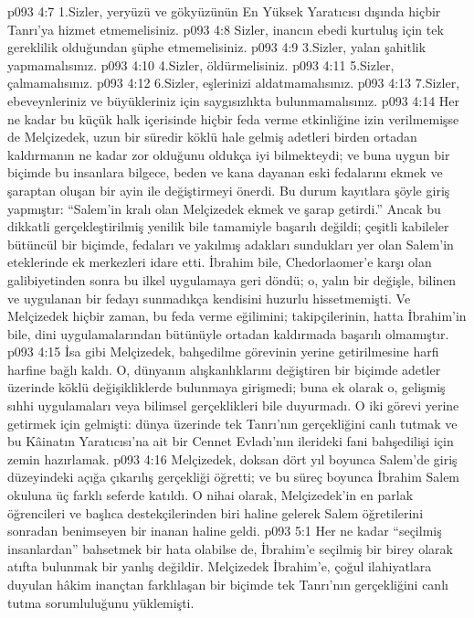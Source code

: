 \vs p093 4:7 1.\bibnobreakspace Sizler, yeryüzü ve gökyüzünün En Yüksek Yaratıcısı dışında hiçbir Tanrı’ya hizmet etmemelisiniz.
\vs p093 4:8 Sizler, inancın ebedi kurtuluş için tek gereklilik olduğundan şüphe etmemelisiniz.
\vs p093 4:9 3.\bibnobreakspace Sizler, yalan şahitlik yapmamalısınız.
\vs p093 4:10 4.\bibnobreakspace Sizler, öldürmelisiniz.
\vs p093 4:11 5.\bibnobreakspace Sizler, çalmamalısınız.
\vs p093 4:12 6.\bibnobreakspace Sizler, eşlerinizi aldatmamalısınız.
\vs p093 4:13 7.\bibnobreakspace Sizler, ebeveynleriniz ve büyükleriniz için saygısızlıkta bulunmamalısınız.
\vs p093 4:14 Her ne kadar bu küçük halk içerisinde hiçbir feda verme etkinliğine izin verilmemişse de Melçizedek, uzun bir süredir köklü hale gelmiş adetleri birden ortadan kaldırmanın ne kadar zor olduğunu oldukça iyi bilmekteydi; ve buna uygun bir biçimde bu insanlara bilgece, beden ve kana dayanan eski fedalarını ekmek ve şaraptan oluşan bir ayin ile değiştirmeyi önerdi. Bu durum kayıtlara şöyle giriş yapmıştır: “Salem’in kralı olan Melçizedek ekmek ve şarap getirdi.” Ancak bu dikkatli gerçekleştirilmiş yenilik bile tamamiyle başarılı değildi; çeşitli kabileler bütüncül bir biçimde, fedaları ve yakılmış adakları sundukları yer olan Salem’in eteklerinde ek merkezleri idare etti. İbrahim bile, Chedorlaomer’e karşı olan galibiyetinden sonra bu ilkel uygulamaya geri döndü; o, yalın bir değişle, bilinen ve uygulanan bir fedayı sunmadıkça kendisini huzurlu hissetmemişti. Ve Melçizedek hiçbir zaman, bu feda verme eğilimini; takipçilerinin, hatta İbrahim’in bile, dini uygulamalarından bütünüyle ortadan kaldırmada başarılı olmamıştır.
\vs p093 4:15 İsa gibi Melçizedek, bahşedilme görevinin yerine getirilmesine harfi harfine bağlı kaldı. O, dünyanın alışkanlıklarını değiştiren bir biçimde adetler üzerinde köklü değişikliklerde bulunmaya girişmedi; buna ek olarak o, gelişmiş sıhhi uygulamaları veya bilimsel gerçeklikleri bile duyurmadı. O iki görevi yerine getirmek için gelmişti: dünya üzerinde tek Tanrı’nın gerçekliğini canlı tutmak ve bu Kâinatın Yaratıcısı’na ait bir Cennet Evladı’nın ilerideki fani bahşedilişi için zemin hazırlamak.
\vs p093 4:16 Melçizedek, doksan dört yıl boyunca Salem’de giriş düzeyindeki açığa çıkarılış gerçekliği öğretti; ve bu süreç boyunca İbrahim Salem okuluna üç farklı seferde katıldı. O nihai olarak, Melçizedek’in en parlak öğrencileri ve başlıca destekçilerinden biri haline gelerek Salem öğretilerini sonradan benimseyen bir inanan haline geldi.
\vs p093 5:1 Her ne kadar “seçilmiş insanlardan” bahsetmek bir hata olabilse de, İbrahim’e seçilmiş bir birey olarak atıfta bulunmak bir yanlış değildir. Melçizedek İbrahim’e, çoğul ilahiyatlara duyulan hâkim inançtan farklılaşan bir biçimde tek Tanrı’nın gerçekliğini canlı tutma sorumluluğunu yüklemişti.
